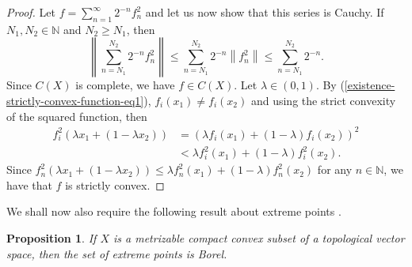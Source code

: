 \documentclass[12pt,a4paper]{amsart}
\newtheorem{proposition}[theorem]{Proposition}
\theoremstyle{definition}
\newcommand{\mynorm}[1]{ \left\| #1 \right\| }
\begin{document}
\begin{proof}
		Let $f = \sum_{n=1}^{\infty}  2^{-n} f_n^{2}$ and let us now show that this series is Cauchy. If $N_1, N_2 \in \mathbb{N}$ and $N_2 \geq N_1$, then
		\[ \mynorm{\sum_{n=N_1}^{N_2} 2^{-n} f_n^{2}}  \leq \sum_{n=N_1}^{N_2} 2^{-n} \mynorm{f_n^{2}} \leq \sum_{n=N_1}^{N_2} 2^{-n}. \]
		Since $C(X)$ is complete, we have $f \in C(X)$. Let $\lambda \in (0, 1)$. By (\ref{existence-strictly-convex-function-eq1}), $f_i(x_1) \neq f_i(x_2)$ and using the strict convexity of the squared function, then
		\begin{equation*}
			\begin{split}
				f_i^{2}(\lambda x_1 + (1-\lambda x_2)) &= (\lambda f_i(x_1) + (1- \lambda) f_i(x_2))^{2} \\
				&< \lambda f_i^{2}(x_1) + (1-\lambda) f_i^{2}(x_2).
			\end{split}
		\end{equation*}
		Since $f_n^{2}(\lambda x_1 + (1-\lambda x_2)) \leq \lambda f_n^{2}(x_1) + (1-\lambda) f_n^{2}(x_2)$ for any $n \in \mathbb{N}$, we have that $f$ is strictly convex.
	\end{proof}
	
	We shall now also require the following result about extreme points \cite[Proposition 1.3]{phelps}.
	
	\begin{proposition}
		If $X$ is a metrizable compact convex subset of a topological vector space, then the set of extreme points is Borel.
	\end{proposition}
	
\end{document}
